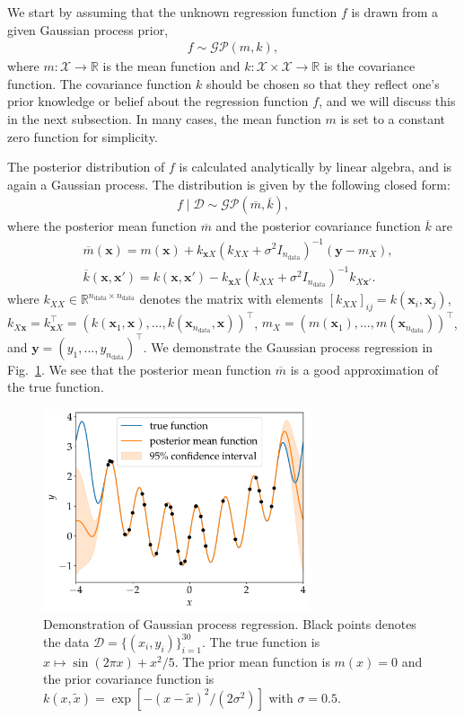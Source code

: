 We start by assuming that the unknown regression function $f$ is drawn from a given Gaussian process prior,
\begin{align}
    f\sim\mathcal{GP}(m, k),
\end{align}
where $m\colon\mathcal{X}\to\mathbb{R}$ is the mean function and $k\colon\mathcal{X}\times\mathcal{X}\to\mathbb{R}$ is the covariance function.
The covariance function $k$ should be chosen so that they reflect one’s prior knowledge or belief about the regression function $f$, and we will discuss this in the next subsection.
In many cases, the mean function $m$ is set to a constant zero function for simplicity.

The posterior distribution of $f$ is calculated analytically by linear algebra, and is again a Gaussian process. The distribution is given by the following closed form:
\begin{align}
    f\mid\mathcal{D}\sim\mathcal{GP}(\overline{m},\overline{k}),
\end{align}
where the posterior mean function $\overline{m}$ and the posterior covariance function $\overline{k}$ are
\begin{align}
    &\overline{m}(\bm{x})=m(\bm{x})+k_{\bm{x}X}(k_{XX}+\sigma^{2}I_{n_{\mathrm{data}}})^{-1}(\bm{y}-m_{X}),\\
    &\overline{k}(\bm{x},\bm{x}')=k(\bm{x},\bm{x}')-k_{\bm{x}X}(k_{XX}+\sigma^{2}I_{n_{\mathrm{data}}})^{-1}k_{X\bm{x}'}.
\end{align}
where $k_{XX}\in\mathbb{R}^{n_{\mathrm{data}}\times n_{\mathrm{data}}}$ denotes the matrix with elements $[k_{XX}]_{ij}=k(\bm{x}_{i},\bm{x}_{j})$,
$k_{X\bm{x}}=k_{\bm{x}X}^{\top}=(k(\bm{x}_{1},\bm{x}),\dots,k(\bm{x}_{n_{\mathrm{data}}},\bm{x}))^{\top}$,
$m_{X}=(m(\bm{x}_{1}),\dots,m(\bm{x}_{n_{\mathrm{data}}}))^{\top}$,
and $\bm{y}=(y_{1},\dots,y_{n_{\mathrm{data}}})^{\top}$.
We demonstrate the Gaussian process regression in Fig.~\ref{fig:gpr-sample}.
We see that the posterior mean function $\overline{m}$ is a good approximation of the true function.
\begin{figure}[htbp]
    \centering
    \includegraphics[width=0.7\textwidth]{figs/gpr_sample.pdf}
    \caption{Demonstration of Gaussian process regression.
    Black points denotes the data $\mathcal{D}=\{(x_{i},y_{i})\}_{i=1}^{30}$.
    The true function is $x\mapsto\sin(2\pi x)+x^{2}/5$.
    The prior mean function is $m(x)=0$ and the prior covariance function is $k(x,\tilde{x})=\exp[-(x-\tilde{x})^{2}/(2\sigma^{2})]$ with $\sigma=0.5$.}
    \label{fig:gpr-sample}
\end{figure}

